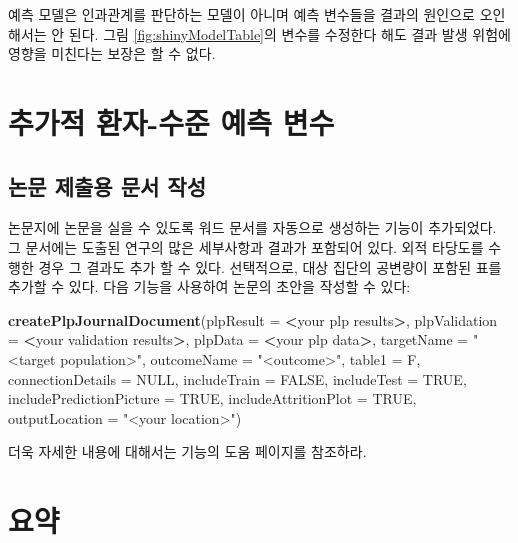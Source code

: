 \documentclass[10.5pt]{book}
\newenvironment{Shaded}{\begin{snugshade}}{\end{snugshade}}
\newcommand{\KeywordTok}[1]{\textcolor[rgb]{0.13,0.29,0.53}{\textbf{#1}}}
\newcommand{\DataTypeTok}[1]{\textcolor[rgb]{0.13,0.29,0.53}{#1}}
\newcommand{\StringTok}[1]{\textcolor[rgb]{0.31,0.60,0.02}{#1}}
\newcommand{\OtherTok}[1]{\textcolor[rgb]{0.56,0.35,0.01}{#1}}
\newcommand{\OperatorTok}[1]{\textcolor[rgb]{0.81,0.36,0.00}{\textbf{#1}}}
\newcommand{\NormalTok}[1]{#1}
\theoremstyle{definition}
\theoremstyle{definition}
\theoremstyle{definition}
\theoremstyle{remark}
\let\BeginKnitrBlock\begin \let\EndKnitrBlock\end
\begin{document}
\BeginKnitrBlock{rmdimportant}
예측 모델은 인과관계를 판단하는 모델이 아니며 예측 변수들을 결과의
원인으로 오인해서는 안 된다. 그림 \ref{fig:shinyModelTable}의 변수를
수정한다 해도 결과 발생 위험에 영향을 미친다는 보장은 할 수 없다.
\EndKnitrBlock{rmdimportant}

\section{추가적 환자-수준 예측 변수}\label{----}

\subsection{논문 제출용 문서 작성}\label{---}

논문지에 논문을 실을 수 있도록 워드 문서를 자동으로 생성하는 기능이
추가되었다. 그 문서에는 도출된 연구의 많은 세부사항과 결과가 포함되어
있다. 외적 타당도를 수행한 경우 그 결과도 추가 할 수 있다. 선택적으로,
대상 집단의 공변량이 포함된 표를 추가할 수 있다. 다음 기능을 사용하여
논문의 초안을 작성할 수 있다:

\begin{Shaded}
\begin{Highlighting}[]
 \KeywordTok{createPlpJournalDocument}\NormalTok{(}\DataTypeTok{plpResult =} \OperatorTok{<}\NormalTok{your plp results}\OperatorTok{>}\NormalTok{,}
             \DataTypeTok{plpValidation =} \OperatorTok{<}\NormalTok{your validation results}\OperatorTok{>}\NormalTok{,}
             \DataTypeTok{plpData =} \OperatorTok{<}\NormalTok{your plp data}\OperatorTok{>}\NormalTok{,}
             \DataTypeTok{targetName =} \StringTok{"<target population>"}\NormalTok{,}
             \DataTypeTok{outcomeName =} \StringTok{"<outcome>"}\NormalTok{,}
             \DataTypeTok{table1 =}\NormalTok{ F,}
             \DataTypeTok{connectionDetails =} \OtherTok{NULL}\NormalTok{,}
             \DataTypeTok{includeTrain =} \OtherTok{FALSE}\NormalTok{,}
             \DataTypeTok{includeTest =} \OtherTok{TRUE}\NormalTok{,}
             \DataTypeTok{includePredictionPicture =} \OtherTok{TRUE}\NormalTok{,}
             \DataTypeTok{includeAttritionPlot =} \OtherTok{TRUE}\NormalTok{,}
             \DataTypeTok{outputLocation =} \StringTok{"<your location>"}\NormalTok{)}
\end{Highlighting}
\end{Shaded}

더욱 자세한 내용에 대해서는 기능의 도움 페이지를 참조하라.

\section{요약}\label{-11}
\end{document}
